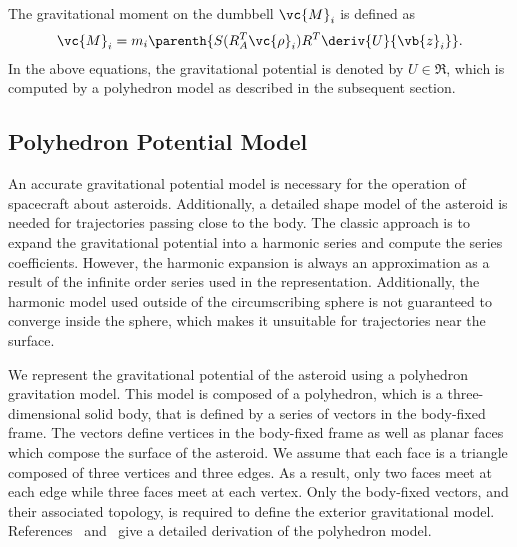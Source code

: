 \documentclass[smallextended]{svjour3}       %
\begin{document}
The gravitational moment on the dumbbell \( \vc{M}_i\) is defined as
\begin{align}
    \vc{M}_i = m_i \parenth{S(R_A^T \vc{\rho}_i) R^T \deriv{U}{\vb{z}_i}}.
\end{align}
In the above equations, the gravitational potential is denoted by $U\in\Re$, which is computed by a polyhedron model as described in the subsequent section. 



\subsection{Polyhedron Potential Model}\label{sec:polyhedron_potential}

An accurate gravitational potential model is necessary for the operation of spacecraft about asteroids.
Additionally, a detailed shape model of the asteroid is needed for trajectories passing close to the body.
The classic approach is to expand the gravitational potential into a harmonic series and compute the series coefficients.
However, the harmonic expansion is always an approximation as a result of the infinite order series used in the representation.
Additionally, the harmonic model used outside of the circumscribing sphere is not guaranteed to converge inside the sphere, which makes it unsuitable for trajectories near the surface.

We represent the gravitational potential of the asteroid using a polyhedron gravitation model.
This model is composed of a polyhedron, which is a three-dimensional solid body, that is defined by a series of vectors in the body-fixed frame.
The vectors define vertices in the body-fixed frame as well as planar faces which compose the surface of the asteroid.
We assume that each face is a triangle composed of three vertices and three edges.
As a result, only two faces meet at each edge while three faces meet at each vertex.
Only the body-fixed vectors, and their associated topology, is required to define the exterior gravitational model.
References~\cite{werner1994} and~\cite{werner1996} give a detailed derivation of the polyhedron model.
\end{document}
